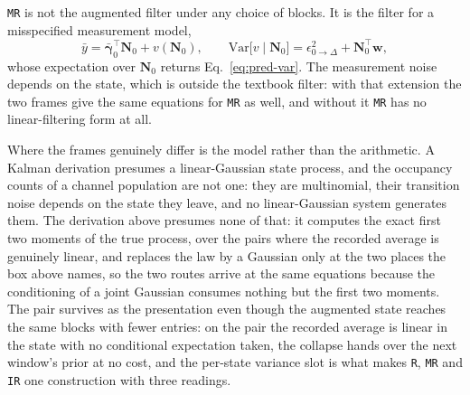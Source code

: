 \begin{appendixbox}
\texttt{MR} is not the augmented filter under any choice of blocks. It is the filter for a
misspecified measurement model,
\begin{equation}
  \bar y = \bar{\bm{\gamma}}_0^\top\mathbf{N}_0 + v(\mathbf{N}_0),
  \qquad
  \mathrm{Var}\bigl[v\mid \mathbf{N}_0\bigr]=\epsilon^2_{0\to\Delta}+\mathbf{N}_0^\top\mathbf{w},
  \label{eq:mr-kf}
\end{equation}
whose expectation over $\mathbf{N}_0$ returns Eq.~\ref{eq:pred-var}. The measurement noise depends
on the state, which is outside the textbook filter: with that extension the two frames give the
same equations for \texttt{MR} as well, and without it \texttt{MR} has no linear-filtering form at
all.

Where the frames genuinely differ is the model rather than the arithmetic. A Kalman derivation
presumes a linear-Gaussian state process, and the occupancy counts of a channel population are not
one: they are multinomial, their transition noise depends on the state they leave, and no
linear-Gaussian system generates them. The derivation above presumes none of that: it computes the
exact first two moments of the true process, over the pairs where the recorded average is genuinely
linear, and replaces the law by a Gaussian only at the two places the box above names, so the two
routes arrive at the same equations because the conditioning of a joint Gaussian consumes nothing
but the first two moments. The pair survives as the presentation even though the augmented state
reaches the same blocks with fewer entries: on the pair the recorded average is linear in
the state with no conditional expectation taken, the collapse hands over the next window's prior at
no cost, and the per-state variance slot is what makes \texttt{R}, \texttt{MR} and \texttt{IR} one
construction with three readings.


\end{appendixbox}
